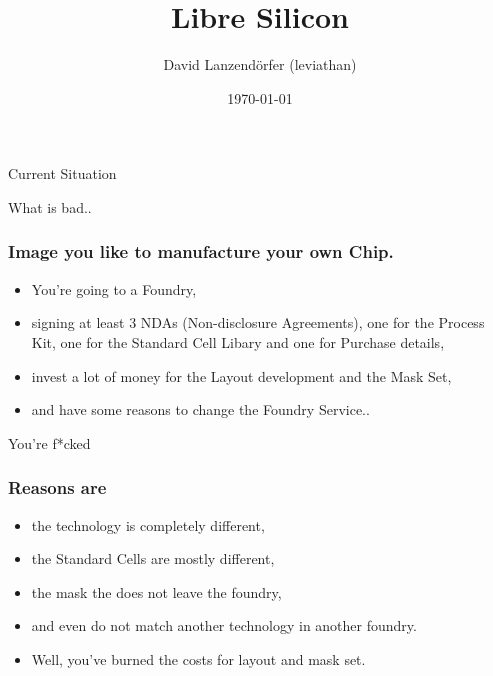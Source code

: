 \documentclass{beamer}
\title[Libre Silicon]{Libre Silicon} %
\author{David Lanzendörfer (leviathan)} %
\institute[Lanceville Technologies Group Ltd.] %
{
Lanceville Technologies Group Ltd.\\ %
\medskip
\textit{david.lanzendoerfer@lanceville.cn} %
}
\date{\today} %
\begin{document}
\begin{frame}
\titlepage %
\end{frame}


\begin{frame}
Current Situation
\end{frame}

\begin{frame}
What is bad..
\end{frame}

\begin{frame}
\frametitle{Image you like to manufacture your own Chip.}
\begin{itemize}
\item You're going to a Foundry,
\item signing at least 3 NDAs (Non-disclosure Agreements), one for the Process Kit, one for the Standard Cell Libary and one for Purchase details,
\item invest a lot of money for the Layout development and the Mask Set,
\item and have some reasons to change the Foundry Service..
\end{itemize}
\end{frame}


\begin{frame}
You're f*cked
\end{frame}

\begin{frame}
\frametitle{Reasons are}
\begin{itemize}
\item the technology is completely different,
\item the Standard Cells are mostly different,
\item the mask the does not leave the foundry,
\item and even do not match another technology in another foundry.
\item Well, you've burned the costs for layout and mask set.
\end{itemize}
\end{frame}
\end{document}
